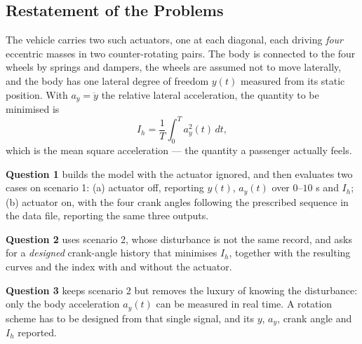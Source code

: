 \documentclass[12pt]{apmcmthesis}
\begin{document}
\subsection{Restatement of the Problems}
The vehicle carries two such actuators, one at each diagonal, each driving \emph{four} eccentric
masses in two counter-rotating pairs. The body is connected to the four wheels by springs and
dampers, the wheels are assumed not to move laterally, and the body has one lateral degree of
freedom $y(t)$ measured from its static position. With $a_y=\ddot y$ the relative lateral
acceleration, the quantity to be minimised is
\begin{equation}
I_h=\frac1T\int_0^T a_y^2(t)\,dt ,
\label{eq:index}
\end{equation}
which is the mean square acceleration --- the quantity a passenger actually feels.

\textbf{Question 1} builds the model with the actuator ignored, and then evaluates two cases on
scenario 1: (a) actuator off, reporting $y(t)$, $a_y(t)$ over $0$--$10$ s and $I_h$; (b) actuator
on, with the four crank angles following the prescribed sequence in the data file, reporting the
same three outputs.

\textbf{Question 2} uses scenario 2, whose disturbance is not the same record, and asks for a
\emph{designed} crank-angle history that minimises $I_h$, together with the resulting curves and
the index with and without the actuator.

\textbf{Question 3} keeps scenario 2 but removes the luxury of knowing the disturbance: only the
body acceleration $a_y(t)$ can be measured in real time. A rotation scheme has to be designed
from that single signal, and its $y$, $a_y$, crank angle and $I_h$ reported.
\end{document}
